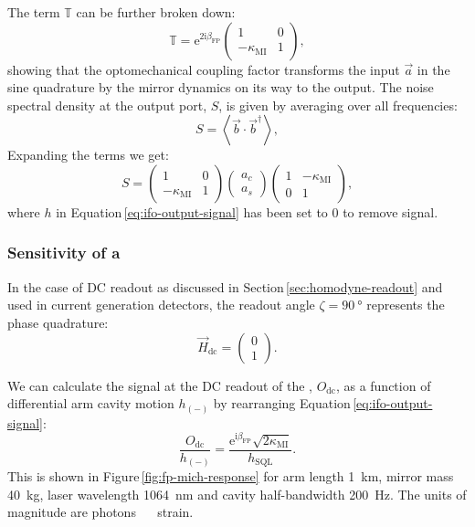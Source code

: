 The term $\mathbb{T}$ can be further broken down:
\begin{equation}
  \mathbb{T} = \text{e}^{2 \text{i} \beta_{\text{FP}}}
  \begin{pmatrix}
    1 & 0 \\
    -\kappa_{\text{MI}} & 1
  \end{pmatrix},
\end{equation}
showing that the optomechanical coupling factor transforms the input $\vec{a}$ in the sine quadrature by the mirror dynamics on its way to the output. The noise spectral density at the output port, $S$, is given by averaging over all frequencies:
\begin{equation}
  S = \left< \vec{b} \cdot \vec{b}^{\dag} \right>,
\end{equation}
Expanding the terms we get:
\begin{equation}
  S =
  \begin{pmatrix}
    1 & 0 \\
    -\kappa_{\text{MI}} & 1
  \end{pmatrix}
  \begin{pmatrix}
    a_c \\
    a_s
  \end{pmatrix}
  \begin{pmatrix}
    1 & -\kappa_{\text{MI}} \\
    0 & 1
  \end{pmatrix},
\end{equation}
where $h$ in Equation\,\ref{eq:ifo-output-signal} has been set to \num{0} to remove signal.

\subsubsection{Sensitivity of a \FPMI{}}
In the case of \gls{DC} readout as discussed in Section\,\ref{sec:homodyne-readout} and used in current generation detectors, the readout angle $\zeta = \SI{90}{\degree}$ represents the phase quadrature:
\begin{equation}
  \vec{H}_{\text{dc}} =
  \begin{pmatrix}
    0 \\
    1
  \end{pmatrix}.
\end{equation}

We can calculate the signal at the \gls{DC} readout of the \FPMI{}, $O_{\text{dc}}$, as a function of differential arm cavity motion $h_{\left( - \right)}$ by rearranging Equation\,\ref{eq:ifo-output-signal}:
\begin{equation}
  \frac{O_{\text{dc}}}{h_{\left( - \right)}} = \frac{\text{e}^{\text{i} \beta_{\text{FP}}} \sqrt{2 \kappa_{\text{MI}}}}{h_{\text{SQL}}}.
\end{equation}
This is shown in Figure\,\ref{fig:fp-mich-response} for arm length \SI{1}{\kilo\meter}, mirror mass \SI{40}{\kilo\gram}, laser wavelength \SI{1064}{\nano\meter} and cavity half-bandwidth \SI{200}{\hertz}. The units of magnitude are photons \SI{}{\per\sqrthz} strain.

